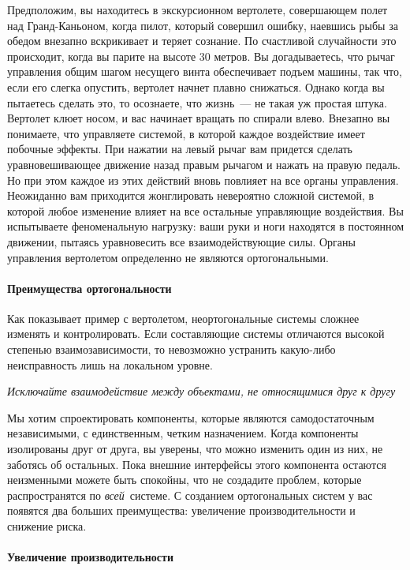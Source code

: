 Предположим, вы находитесь в экскурсионном вертолете, совершающем полет над
Гранд-Каньоном, когда пилот, который совершил ошибку, наевшись рыбы за обедом
внезапно вскрикивает и теряет сознание. По счастливой случайности это
происходит, когда вы парите на высоте 30 метров. Вы догадываетесь, что рычаг
управления общим шагом несущего винта обеспечивает подъем машины, так что, если
его слегка опустить, вертолет начнет плавно снижаться. Однако когда вы пытаетесь
сделать это, то осознаете, что жизнь\ --- не такая уж простая штука. Вертолет
клюет носом, и вас начинает вращать по спирали влево. Внезапно вы понимаете, что
управляете системой, в которой каждое воздействие имеет побочные эффекты. При
нажатии на левый рычаг вам придется сделать уравновешивающее движение назад
правым рычагом и нажать на правую педаль. Но при этом каждое из этих действий
вновь повлияет на все органы управления. Неожиданно вам приходится жонглировать
невероятно сложной системой, в которой любое изменение влияет на все остальные
управляющие воздействия. Вы испытываете феноменальную нагрузку: ваши руки и ноги
находятся в постоянном движении, пытаясь уравновесить все взаимодействующие
силы. Органы управления вертолетом определенно не являются ортогональными.

\paragraph{Преимущества ортогональности}

Как показывает пример с вертолетом, неортогональные системы сложнее изменять и
контролировать. Если составляющие системы отличаются высокой степенью
взаимозависимости, то невозможно устранить какую-либо неисправность лишь на
локальном уровне.

\bigskip
\emph{Исключайте взаимодействие между объектами, не относящимися друг к другу}
\bigskip

Мы хотим спроектировать компоненты, которые являются самодостаточным
независимыми, с единственным, четким назначением. Когда компоненты изолированы
друг от друга, вы уверены, что можно изменить один из них, не заботясь об
остальных. Пока внешние интерфейсы этого компонента остаются неизменными можете
быть спокойны, что не создадите проблем, которые распространятся по
\emph{всей}\ системе. С созданием ортогональных систем у вас появятся два
больших преимущества: увеличение производительности и снижение риска.

\paragraph{Увеличение производительности}

